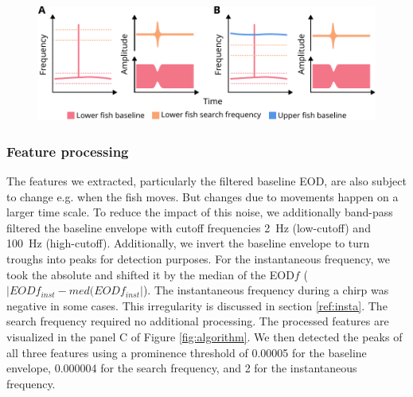 \begin{figure}[H]
    \centering
    \includegraphics[width=\linewidth]{figures/dynamic.pdf}
    \label{fig:dynamic}
\end{figure}

\subsubsection{Feature processing}

The features we extracted, particularly the filtered baseline EOD, are also subject to change e.g. when the fish moves. But changes due to movements happen on a larger time scale. To reduce the impact of this noise, we additionally band-pass filtered the baseline envelope with cutoff frequencies \SI{2}{\hertz} (low-cutoff) and \SI{100}{\hertz} (high-cutoff). Additionally, we invert the baseline envelope to turn troughs into peaks for detection purposes. For the instantaneous frequency, we took the absolute and shifted it by the median of the EOD$f$ ($|EODf_{inst} - med({EODf_{inst}}|$). The instantaneous frequency during a chirp was negative in some cases. This irregularity is discussed in section \ref{ref:insta}. 
The search frequency required no additional processing. The processed features are visualized in the panel C of Figure \ref{fig:algorithm}. We then detected the peaks of all three features using a prominence threshold of 0.00005 for the baseline envelope, 0.000004 for the search frequency, and 2 for the instantaneous frequency.

